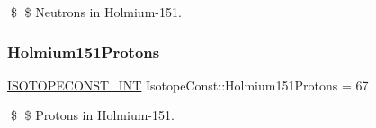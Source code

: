 \$ \$ Neutrons in Holmium-\/151. \mbox{\label{group___isotope_const-_holmium-_ho151_ga324bb905211ed9be1806de9063aaf3c4}} 
\subsubsection{\texorpdfstring{Holmium151\+Protons}{Holmium151Protons}}
{\footnotesize\ttfamily \mbox{\hyperlink{group___isotope_const-_macros_ga5f18360b3e99483a35c32d789e62621c}{I\+S\+O\+T\+O\+P\+E\+C\+O\+N\+S\+T\+\_\+\+I\+NT}} Isotope\+Const\+::\+Holmium151\+Protons = 67}

\$ \$ Protons in Holmium-\/151. 